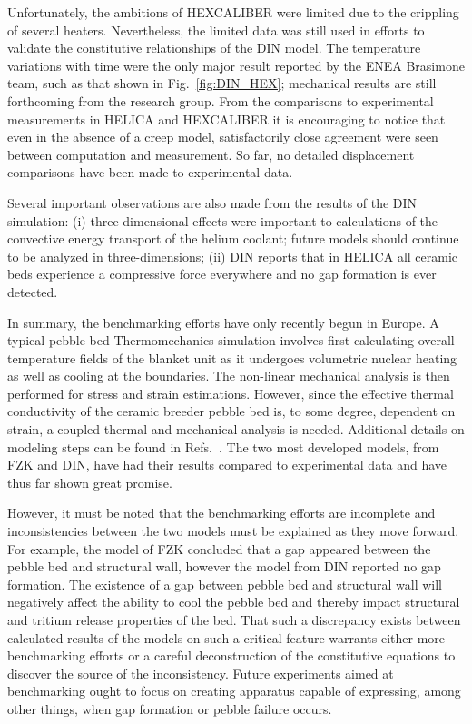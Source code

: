 Unfortunately, the ambitions of HEXCALIBER were limited due to the crippling of several heaters. Nevertheless, the limited data was still used in efforts to validate the constitutive relationships of the DIN model. The temperature variations with time were the only major result reported by the ENEA Brasimone team, such as that shown in Fig.~\ref{fig:DIN_HEX}; mechanical results are still forthcoming from the research group. From the comparisons to experimental measurements in HELICA and HEXCALIBER it is encouraging to notice that even in the absence of a creep model, satisfactorily close agreement were seen between computation and measurement. So far, no detailed displacement comparisons have been made to experimental data.

Several important observations are also made from the results of the DIN simulation: (i) three-dimensional effects were important to calculations of the convective energy transport of the helium coolant; future models should continue to be analyzed in three-dimensions; (ii) DIN reports that in HELICA all ceramic beds experience a compressive force everywhere and no gap formation is ever detected. 

In summary, the benchmarking efforts have only recently begun in Europe. A typical pebble bed Thermomechanics simulation involves first calculating overall temperature fields of the blanket unit as it undergoes volumetric nuclear heating as well as cooling at the boundaries. The non-linear mechanical analysis is then performed for stress and strain estimations. However, since the effective thermal conductivity of the ceramic breeder pebble bed is, to some degree, dependent on strain, a coupled thermal and mechanical analysis is needed. Additional details on modeling steps can be found in Refs.~\cite{DellOrco:2010zr,DiMaio20081287,DiMaio20101234,Gan:2009vn,Gan:2010lh,dellorco:2006}. The two most developed models, from FZK and DIN, have had their results compared to experimental data and have thus far shown great promise. 

However, it must be noted that the benchmarking efforts are incomplete and inconsistencies between the two models must be explained as they move forward. For example, the model of FZK concluded that a gap appeared between the pebble bed and structural wall, however the model from DIN reported no gap formation. The existence of a gap between pebble bed and structural wall will negatively affect the ability to cool the pebble bed and thereby impact structural and tritium release properties of the bed. That such a discrepancy exists between calculated results of the models on such a critical feature warrants either more benchmarking efforts or a careful deconstruction of the constitutive equations to discover the source of the inconsistency. Future experiments aimed at benchmarking ought to focus on creating apparatus capable of expressing, among other things, when gap formation or pebble failure occurs.


